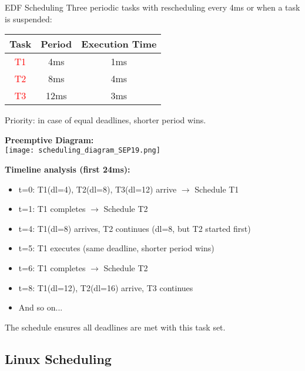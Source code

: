 \begin{example2}{EDF Scheduling}
    Three periodic tasks with rescheduling every 4ms or when a task is suspended: 
    
    \begin{tabular}{|c|c|c|}
        \hline
        Task & Period & Execution Time \\
        \hline
        \textcolor{red}{T1} & 4ms & 1ms \\
        \textcolor{red}{T2} & 8ms & 4ms \\
        \textcolor{red}{T3} & 12ms & 3ms \\
        \hline
    \end{tabular}

    Priority: in case of equal deadlines, shorter period wins.

    \tcblower
    \textbf{Preemptive Diagram:}\\
    \texttt{[image: scheduling\_diagram\_SEP19.png]}
    
    \textbf{Timeline analysis (first 24ms):}
    \begin{itemize}
        \item t=0: T1(dl=4), T2(dl=8), T3(dl=12) arrive $\rightarrow$ Schedule T1
        \item t=1: T1 completes $\rightarrow$ Schedule T2  
        \item t=4: T1(dl=8) arrives, T2 continues (dl=8, but T2 started first)
        \item t=5: T1 executes (same deadline, shorter period wins)
        \item t=6: T1 completes $\rightarrow$ Schedule T2
        \item t=8: T1(dl=12), T2(dl=16) arrive, T3 continues
        \item And so on...
    \end{itemize}
    
    The schedule ensures all deadlines are met with this task set.
\end{example2}

\raggedcolumns
\columnbreak

\subsection{Linux Scheduling}


